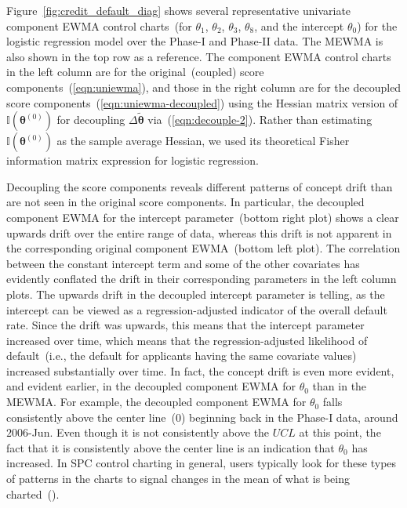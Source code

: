 \documentclass[twoside,11pt]{article}
\begin{document}
Figure~\ref{fig:credit_default_diag} shows several representative univariate component EWMA control charts~(for $\theta_1$, $\theta_2$, $\theta_3$, $\theta_8$, and the intercept $\theta_0$) for the logistic regression model over the Phase-I and Phase-II data. The MEWMA is also shown in the top row as a reference. The component EWMA control charts in the left column are for the original~(coupled) score components~(\ref{eqn:uniewma}), and those in the right column are for the decoupled score components~(\ref{eqn:uniewma-decoupled}) using the Hessian matrix version of $\mathbb {I}(\bm { \theta}^{ (0)})$ for decoupling $\Delta \tilde{\bm { \theta}}$ via~(\ref{eqn:decouple-2}). Rather than estimating $\mathbb {I}(\bm { \theta}^{ (0)})$ as the sample average Hessian, we used its theoretical Fisher information matrix expression for logistic regression. 

Decoupling the score components reveals different patterns of concept drift than are not seen in the original score components. In particular, the decoupled component EWMA for the intercept parameter~(bottom right plot) shows a clear upwards drift over the entire range of data, whereas this drift is not apparent in the corresponding original component EWMA~(bottom left plot). The correlation between the constant intercept term and some of the other covariates has evidently conflated the drift in their corresponding parameters in the left column plots. The upwards drift in the decoupled intercept parameter is telling, as the intercept can be viewed as a regression-adjusted indicator of the overall default rate. Since the drift was upwards, this means that the intercept parameter increased over time, which means that the regression-adjusted likelihood of default~(i.e., the default for applicants having the same covariate values) increased substantially over time. In fact, the concept drift is even more evident, and evident earlier, in the decoupled component EWMA for $\theta_0$ than in the MEWMA. For example, the decoupled component EWMA for $\theta_0$ falls consistently above the center line~($0$) beginning back in the Phase-I data, around $2006$-Jun. Even though it is not consistently above the $UCL$ at this point, the fact that it is consistently above the center line is an indication that $\theta_0$ has increased. In SPC control charting in general, users typically look for these types of patterns in the charts to signal changes in the mean of what is being charted~(\cite{montgomery2007introduction}). 
\end{document}
